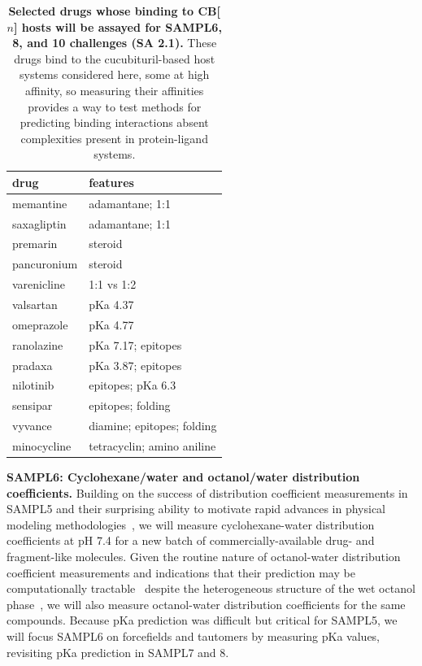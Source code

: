 \documentclass[11pt]{article}
\begin{document}
\begin{table}
\footnotesize
\begin{tabular}{l | l}
{\bf drug} & {\bf features} \\
\hline
memantine & adamantane; 1:1 \\
saxagliptin & adamantane; 1:1 \\
premarin & steroid \\
pancuronium & steroid\\
varenicline & 1:1 vs 1:2 \\
valsartan & pKa 4.37 \\ 
omeprazole & pKa 4.77 \\
ranolazine & pKa 7.17; epitopes \\
pradaxa & pKa 3.87; epitopes \\
nilotinib & epitopes; pKa 6.3 \\
sensipar & epitopes; folding \\
vyvance & diamine; epitopes; folding \\
minocycline & tetracyclin; amino aniline \\
\end{tabular}
\caption{\label{table:CB} \textbf{Selected drugs whose binding to CB[$n$] hosts will be assayed for SAMPL6, 8, and 10 challenges (SA 2.1).} These drugs bind to the cucubituril-based host systems considered here, some at high affinity, so measuring their affinities provides a way to test methods for predicting binding interactions absent complexities present in protein-ligand systems.
}
\end{table}

\textbf{SAMPL6: Cyclohexane/water and octanol/water distribution coefficients.}
Building on the success of distribution coefficient measurements in SAMPL5 and their surprising ability to motivate rapid advances in physical modeling methodologies~\cite{bannan_blind_2016}, we will measure cyclohexane-water distribution coefficients at pH 7.4 for a new batch of commercially-available drug- and fragment-like molecules.
Given the routine nature of octanol-water distribution coefficient measurements and indications that their prediction may be computationally tractable~\cite{Bhatnagar:2013:PhysicalChemistryChemicalPhysics, bannan_calculating_2016} despite the heterogeneous structure of the wet octanol phase~\cite{Kollman:1996:AccountsofChemicalResearch}, we will also measure octanol-water distribution coefficients for the same compounds.
Because pKa prediction was difficult but critical for SAMPL5, we will focus SAMPL6 on forcefields and tautomers by measuring pKa values, revisiting pKa prediction in SAMPL7 and 8.
\end{document}
